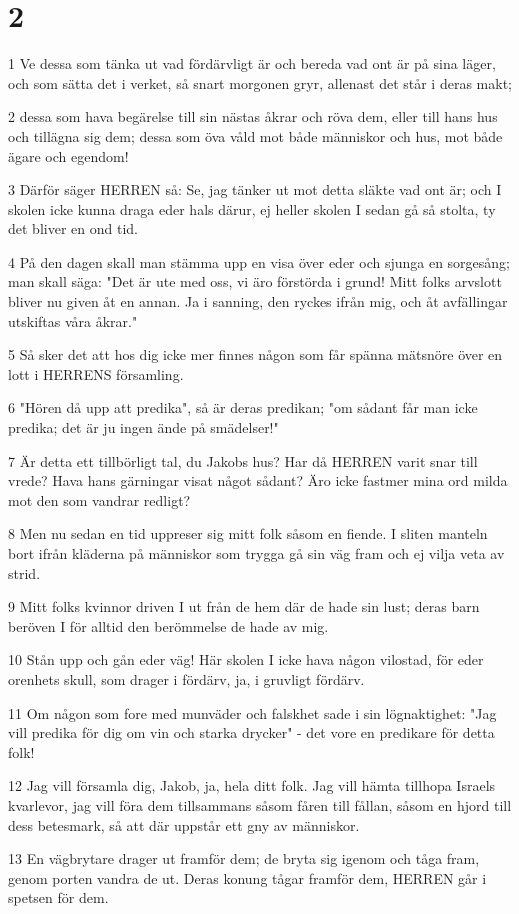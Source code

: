 \chapter{2}

\par 1 Ve dessa som tänka ut vad fördärvligt är och bereda vad ont är på sina läger, och som sätta det i verket, så snart morgonen gryr, allenast det står i deras makt;
\par 2 dessa som hava begärelse till sin nästas åkrar och röva dem, eller till hans hus och tillägna sig dem; dessa som öva våld mot både människor och hus, mot både ägare och egendom!
\par 3 Därför säger HERREN så: Se, jag tänker ut mot detta släkte vad ont är; och I skolen icke kunna draga eder hals därur, ej heller skolen I sedan gå så stolta, ty det bliver en ond tid.
\par 4 På den dagen skall man stämma upp en visa över eder och sjunga en sorgesång; man skall säga: "Det är ute med oss, vi äro förstörda i grund! Mitt folks arvslott bliver nu given åt en annan. Ja i sanning, den ryckes ifrån mig, och åt avfällingar utskiftas våra åkrar."
\par 5 Så sker det att hos dig icke mer finnes någon som får spänna mätsnöre över en lott i HERRENS församling.
\par 6 "Hören då upp att predika", så är deras predikan; "om sådant får man icke predika; det är ju ingen ände på smädelser!"
\par 7 Är detta ett tillbörligt tal, du Jakobs hus? Har då HERREN varit snar till vrede? Hava hans gärningar visat något sådant? Äro icke fastmer mina ord milda mot den som vandrar redligt?
\par 8 Men nu sedan en tid uppreser sig mitt folk såsom en fiende. I sliten manteln bort ifrån kläderna på människor som trygga gå sin väg fram och ej vilja veta av strid.
\par 9 Mitt folks kvinnor driven I ut från de hem där de hade sin lust; deras barn beröven I för alltid den berömmelse de hade av mig.
\par 10 Stån upp och gån eder väg! Här skolen I icke hava någon vilostad, för eder orenhets skull, som drager i fördärv, ja, i gruvligt fördärv.
\par 11 Om någon som fore med munväder och falskhet sade i sin lögnaktighet: "Jag vill predika för dig om vin och starka drycker" - det vore en predikare för detta folk!
\par 12 Jag vill församla dig, Jakob, ja, hela ditt folk. Jag vill hämta tillhopa Israels kvarlevor, jag vill föra dem tillsammans såsom fåren till fållan, såsom en hjord till dess betesmark, så att där uppstår ett gny av människor.
\par 13 En vägbrytare drager ut framför dem; de bryta sig igenom och tåga fram, genom porten vandra de ut. Deras konung tågar framför dem, HERREN går i spetsen för dem.

